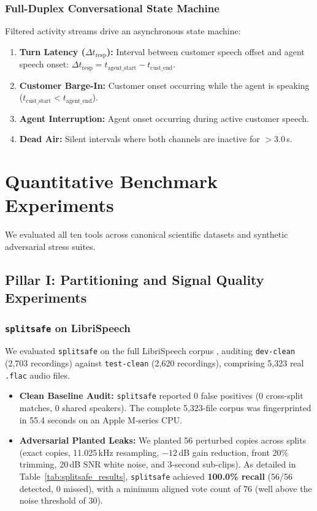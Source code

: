 \documentclass[10pt,journal,compsoc]{IEEEtran}
\begin{document}
\subsubsection{Full-Duplex Conversational State Machine}
Filtered activity streams drive an asynchronous state machine:
\begin{enumerate}
    \item \textbf{Turn Latency ($\Delta t_{\text{resp}}$):} Interval between customer speech offset and agent speech onset: $\Delta t_{\text{resp}} = t_{\text{agent\_start}} - t_{\text{cust\_end}}$.
    \item \textbf{Customer Barge-In:} Customer onset occurring while the agent is speaking ($t_{\text{cust\_start}} < t_{\text{agent\_end}}$).
    \item \textbf{Agent Interruption:} Agent onset occurring during active customer speech.
    \item \textbf{Dead Air:} Silent intervals where both channels are inactive for $>3.0$\,s.
\end{enumerate}

\section{Quantitative Benchmark Experiments}
We evaluated all ten tools across canonical scientific datasets and synthetic adversarial stress suites.

\subsection{Pillar I: Partitioning and Signal Quality Experiments}

\subsubsection{\texttt{splitsafe} on LibriSpeech}
We evaluated \texttt{splitsafe} on the full LibriSpeech corpus \cite{panayotov2015librispeech}, auditing \texttt{dev-clean} (2,703 recordings) against \texttt{test-clean} (2,620 recordings), comprising 5,323 real \texttt{.flac} audio files.
\begin{itemize}
    \item \textbf{Clean Baseline Audit:} \texttt{splitsafe} reported 0 false positives (0 cross-split matches, 0 shared speakers). The complete 5,323-file corpus was fingerprinted in 55.4 seconds on an Apple M-series CPU.
    \item \textbf{Adversarial Planted Leaks:} We planted 56 perturbed copies across splits (exact copies, 11.025\,kHz resampling, $-12$\,dB gain reduction, front 20\% trimming, 20\,dB SNR white noise, and 3-second sub-clips). As detailed in Table~\ref{tab:splitsafe_results}, \texttt{splitsafe} achieved \textbf{100.0\% recall} (56/56 detected, 0 missed), with a minimum aligned vote count of 76 (well above the noise threshold of 30).
\end{itemize}
\end{document}
